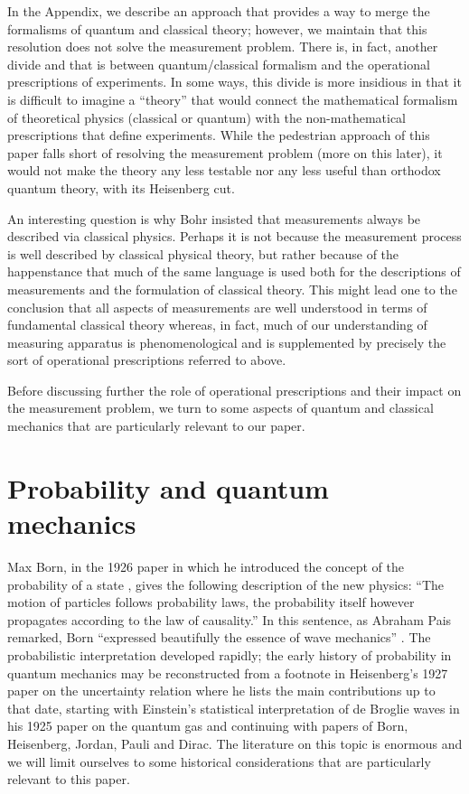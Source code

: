 \documentclass [12pt]{revtex4}
\begin{document}
In the Appendix, we describe an approach that provides a way to merge
the formalisms of quantum and classical theory; however, we maintain that this resolution
does not solve the measurement problem.  There is, in fact, another divide and
that is between quantum/classical formalism and the operational  prescriptions
of experiments.  In some ways, this divide is more insidious in that it is difficult
to imagine a “theory” that would connect the mathematical formalism of theoretical
physics (classical or quantum) with the non-mathematical prescriptions that
define experiments.  While the pedestrian approach of this paper falls short of
resolving the measurement problem (more on this later), it would not make the theory
any less testable nor any less useful than orthodox quantum theory, with its Heisenberg
cut.

An interesting question is why Bohr insisted that
measurements always be described via classical physics. Perhaps it
is not because the measurement process is well described by
classical physical theory, but rather because of the happenstance
that much of the same language is used both for the descriptions of
measurements and the formulation of classical theory.  This might
lead one to the conclusion that all aspects of measurements are well
understood in terms of fundamental classical theory whereas, in fact,
much of our understanding of measuring apparatus is phenomenological
and is supplemented by precisely the sort of operational prescriptions
referred to above.

Before discussing further the role of operational prescriptions and
their impact on the measurement problem, we turn to some aspects of
quantum and classical mechanics that are particularly relevant to our paper. 

\section{Probability and quantum mechanics}\label{PAQM}

Max Born, in the 1926 paper in which he introduced the concept of the probability of a state \cite{B1926a}, gives the following description of the new physics: ``The motion of particles follows probability laws, the probability itself however propagates according to the law of causality.'' In this sentence, as Abraham Pais remarked, Born ``expressed beautifully the essence of wave mechanics'' \cite{P1986}. The probabilistic interpretation developed rapidly; the early history of probability in quantum mechanics may be reconstructed from a footnote in Heisenberg's 1927 paper on the uncertainty relation \cite{H1927} where he lists the main contributions up to that date, starting with Einstein's statistical interpretation of de Broglie waves in his 1925 paper on the quantum gas and continuing with papers of Born, Heisenberg, Jordan, Pauli and Dirac. The literature on this topic is enormous and we will limit ourselves to some historical considerations that are particularly relevant to this paper.
\end{document}
